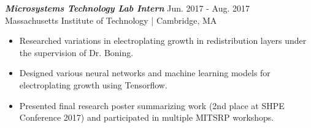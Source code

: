 \documentclass[letter]{res}
\begin{document}
\begin{resume}
{\sl \textbf{Microsystems Technology Lab Intern}} \hfill Jun. 2017 - Aug. 2017\\
Massachusetts Institute of Technology | Cambridge, MA \newline

 \vspace{-4mm}

 \begin{itemize}
 \item Researched variations in electroplating growth in redistribution layers under the supervision of Dr. Boning.
 \item Designed various neural networks and machine learning models for electroplating growth using Tensorflow.
 \item Presented final research poster summarizing work (2nd place at SHPE Conference 2017) and participated in multiple MITSRP workshops.
 \end{itemize}

\vspace{-2mm}

%
%
%

%
%
%


\end{resume}
\end{document}
